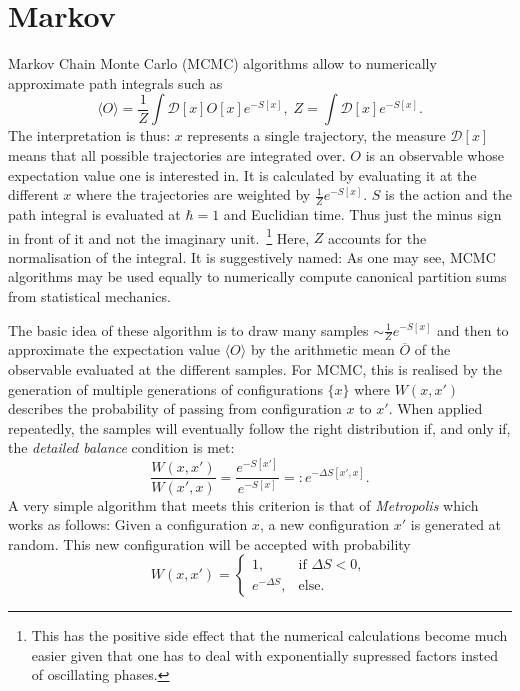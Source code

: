 \documentclass{scrartcl}
\begin{document}
\section{Markov} \label{sec:markov}
Markov Chain Monte Carlo (MCMC) algorithms allow to numerically approximate
path integrals such as~\cite{freedmanCreutz}
\[
    \langle O \rangle = \frac{1}{Z} \int \mathscr{D} [x] O[x] e^{-S[x]},
    \; Z = \int \mathscr{D} [x] e^{-S[x]}.
\]
The interpretation is thus: $x$ represents a single trajectory, the measure
$\mathscr{D}[x]$ means that all possible trajectories are integrated over. $O$ is
an observable whose expectation value one is interested in. It is calculated by
evaluating it at the different $x$ where the trajectories are weighted by
$\frac{1}{Z}e^{-S[x]}$. $S$ is the action and the path integral is
evaluated at $\hbar = 1$ and Euclidian time. Thus just the minus sign in front of it and not the
imaginary unit.~\footnote{This has the positive side effect that the numerical
calculations become much easier given that one has to deal with exponentially
supressed factors insted of oscillating phases.}
Here, $Z$ accounts for the normalisation of the integral. It is suggestively named:
As one may see, MCMC algorithms may be used equally to numerically compute
canonical partition sums from statistical mechanics.

The basic idea of these algorithm is to draw many samples
$\sim \frac{1}{Z} e^{-S[x]}$ and then to approximate the expectation
value $\langle O \rangle$ by the arithmetic mean $\overline{O}$ of the observable
evaluated at the  different samples. For MCMC, this is realised by the generation
of multiple generations of configurations $\{x\}$ where $W(x,x')$ describes the
probability of passing from configuration $x$ to $x'$. When applied repeatedly,
the samples will eventually follow the right distribution if, and only if, the
\emph{detailed balance} condition is met:~\cite{freedmanCreutz}
\[
    \frac{W(x,x')}{W(x',x)} = \frac{e^{-S[x']}}{e^{-S[x]}} =: e^{-\Delta S[x',x]}.
\]
A very simple algorithm that meets this criterion is that of \emph{Metropolis}
which works as follows: Given a configuration $x$, a new configuration $x'$ is
generated at random. This new configuration will be accepted with probability
~\cite{freedmanCreutz}
\begin{equation} \label{eq:metropolis}
W(x,x') = \begin{cases}
    1, &\text{if } \Delta S < 0,\\
    e^{-\Delta S}, &\text{else}.
\end{cases}
\end{equation}
\end{document}
